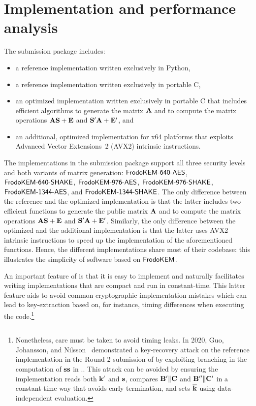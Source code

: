 \section{Implementation and performance analysis}%
\label{sec:performance}

\ifshoworiginal
The submission package includes:
\begin{itemize}
\item a reference implementation written exclusively in Python,
\item a reference implementation written exclusively in portable C,
\item an optimized implementation written exclusively in portable C that includes efficient algorithms to generate the matrix $\mathbf{A}$ and to compute the matrix operations $\mathbf{A} \mathbf{S} + \mathbf{E}$ and $\mathbf{S}' \mathbf{A} + \mathbf{E}'$, and
\item an additional, optimized implementation for x64 platforms that exploits Advanced Vector Extensions~2 (AVX2) intrinsic instructions.
\end{itemize}

The implementations in the submission package support all three security levels and both variants of matrix generation:
$\textsf{\upshape\mdseries FrodoKEM-640-AES}$, $\textsf{\upshape\mdseries FrodoKEM-640-SHAKE}$, $\textsf{\upshape\mdseries FrodoKEM-976-AES}$, $\textsf{\upshape\mdseries FrodoKEM-976-SHAKE}$, $\textsf{\upshape\mdseries FrodoKEM-1344-AES}$, and $\textsf{\upshape\mdseries FrodoKEM-1344-SHAKE}$. 
The only difference between the reference and the optimized implementation is that the latter includes two efficient functions to generate the public matrix $\mathbf{A}$ and to compute the matrix operations $\mathbf{A} \mathbf{S} + \mathbf{E}$ and $\mathbf{S}' \mathbf{A} + \mathbf{E}'$. Similarly, the only difference between the optimized and the additional implementation is that the latter uses AVX2 intrinsic instructions to speed up the implementation of the aforementioned functions. 
Hence, the different implementations share most of their codebase: this illustrates the simplicity of software based on $\textsf{\upshape\mdseries FrodoKEM}$. 

\else

An important feature of \FrodoKEM is that it is easy to implement and naturally facilitates
writing implementations that are compact and run in constant-time.
This latter feature aids to avoid common cryptographic implementation mistakes which can lead
to key-extraction based on, for instance, timing differences when executing the code.\footnote{Nonetheless,
care must be taken to avoid timing leaks. In 2020, Guo, Johansson, and Nilsson~\cite{C:GuoJohNil20}
demonstrated a key-recovery attack on the reference implementation in the Round 2 submission of \FrodoKEM
by exploiting branching in the computation of $\mathbf{s}\mathbf{s}$ in \FrodoKEM.\Decaps. This attack can be avoided
by ensuring the implementation reads both $\mathbf{k}'$ and $\mathbf{s}$, compares $\mathbf{B}' \| \mathbf{C}$ and $\mathbf{B}'' \| \mathbf{C}'$
in a constant-time way that avoids early termination, and sets $\overline{\mathbf{k}}$ using data-independent evaluation.}

